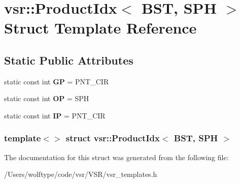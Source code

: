 \hypertarget{structvsr_1_1_product_idx_3_01_b_s_t_00_01_s_p_h_01_4}{\section{vsr\-:\-:Product\-Idx$<$ B\-S\-T, S\-P\-H $>$ Struct Template Reference}
\label{structvsr_1_1_product_idx_3_01_b_s_t_00_01_s_p_h_01_4}
}
\subsection*{Static Public Attributes}
\begin{DoxyCompactItemize}
\item 
\hypertarget{structvsr_1_1_product_idx_3_01_b_s_t_00_01_s_p_h_01_4_add5946e7d987fc1c0a64588089f3d377}{static const int {\bfseries G\-P} = P\-N\-T\-\_\-\-C\-I\-R}\label{structvsr_1_1_product_idx_3_01_b_s_t_00_01_s_p_h_01_4_add5946e7d987fc1c0a64588089f3d377}

\item 
\hypertarget{structvsr_1_1_product_idx_3_01_b_s_t_00_01_s_p_h_01_4_a7f5edd5320698646bb85df88150ef20e}{static const int {\bfseries O\-P} = S\-P\-H}\label{structvsr_1_1_product_idx_3_01_b_s_t_00_01_s_p_h_01_4_a7f5edd5320698646bb85df88150ef20e}

\item 
\hypertarget{structvsr_1_1_product_idx_3_01_b_s_t_00_01_s_p_h_01_4_a5dea5c24374accca188ecdb2b34200f5}{static const int {\bfseries I\-P} = P\-N\-T\-\_\-\-C\-I\-R}\label{structvsr_1_1_product_idx_3_01_b_s_t_00_01_s_p_h_01_4_a5dea5c24374accca188ecdb2b34200f5}

\end{DoxyCompactItemize}
\subsubsection*{template$<$$>$ struct vsr\-::\-Product\-Idx$<$ B\-S\-T, S\-P\-H $>$}



The documentation for this struct was generated from the following file\-:\begin{DoxyCompactItemize}
\item 
/\-Users/wolftype/code/vsr/\-V\-S\-R/vsr\-\_\-templates.\-h\end{DoxyCompactItemize}
